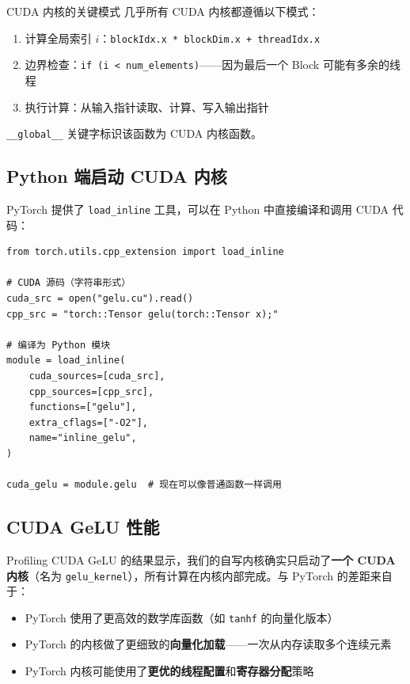 \begin{knowledgebox}{CUDA 内核的关键模式}
几乎所有 CUDA 内核都遵循以下模式：
\begin{enumerate}
    \item 计算全局索引 $i$：\texttt{blockIdx.x * blockDim.x + threadIdx.x}
    \item 边界检查：\texttt{if (i < num\_elements)}——因为最后一个 Block 可能有多余的线程
    \item 执行计算：从输入指针读取、计算、写入输出指针
\end{enumerate}
\texttt{\_\_global\_\_} 关键字标识该函数为 CUDA 内核函数。
\end{knowledgebox}

\subsection{Python 端启动 CUDA 内核}

PyTorch 提供了 \texttt{load\_inline} 工具，可以在 Python 中直接编译和调用 CUDA 代码：

\begin{lstlisting}[caption={在 Python 中编译和使用 CUDA 代码}]
from torch.utils.cpp_extension import load_inline

# CUDA 源码（字符串形式）
cuda_src = open("gelu.cu").read()
cpp_src = "torch::Tensor gelu(torch::Tensor x);"

# 编译为 Python 模块
module = load_inline(
    cuda_sources=[cuda_src],
    cpp_sources=[cpp_src],
    functions=["gelu"],
    extra_cflags=["-O2"],
    name="inline_gelu",
)

cuda_gelu = module.gelu  # 现在可以像普通函数一样调用
\end{lstlisting}

\subsection{CUDA GeLU 性能}

Profiling CUDA GeLU 的结果显示，我们的自写内核确实只启动了\textbf{一个 CUDA 内核}（名为 \texttt{gelu\_kernel}），所有计算在内核内部完成。与 PyTorch 的差距来自于：

\begin{itemize}
    \item PyTorch 使用了更高效的数学库函数（如 \texttt{tanhf} 的向量化版本）
    \item PyTorch 的内核做了更细致的\textbf{向量化加载}——一次从内存读取多个连续元素
    \item PyTorch 内核可能使用了\textbf{更优的线程配置}和\textbf{寄存器分配}策略
\end{itemize}

